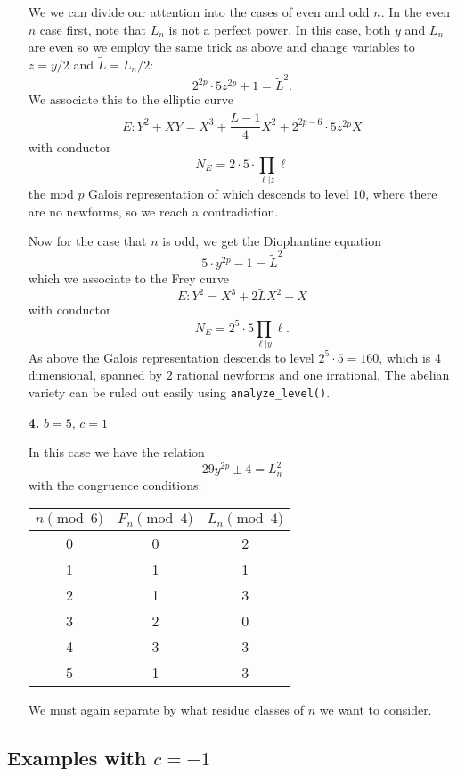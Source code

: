 \documentclass[12pt]{article}
\begin{document}
\begin{enumerate}
We we can divide our attention into the cases of even and odd $n$.  In the even $n$ case first, note that $L_n$ is not a perfect power.  In this case, both $y$ and $L_n$ are even so we employ the same trick as above and change variables to $z = y/2$ and $\tilde{L} =  L_n/2$:
\[ 2^{2p} \cdot 5 z^{2p} + 1 = \tilde{L}^2. \]
We associate this to the elliptic curve 
\[ E: Y^2 + XY = X^3 + \frac{\tilde{L} -1}{4} X^2 + 2^{2p-6} \cdot 5 z^{2p} X \]
with conductor
\[N_E = 2 \cdot 5 \cdot \prod_{\ell | z} \ell \]
the mod $p$ Galois representation of which descends to level $10$, where there are no newforms, so we reach a contradiction.

Now for the case that $n$ is odd, we get the Diophantine equation
\[ 5 \cdot y^{2p} -1 = \tilde{L}^2 \]
which we associate to the Frey curve
\[ E: Y^2 = X^3 + 2\tilde{L} X^2 - X \]
with conductor
\[N_E = 2^5\cdot 5 \prod_{\ell | y} \ell. \]
As above the Galois representation descends to level $2^5 \cdot 5 = 160$, which is 4 dimensional, spanned by $2$ rational newforms and one irrational.   The abelian variety can be ruled out easily using \texttt{analyze\_level()}.

\item[\textbf{4.}] $b = 5$, $c = 1$

In this case we have the relation 
\[ 29y^{2p} \pm 4 = L_n^2 \]
with the congruence conditions:
\begin{center}
\begin{tabular}{c| c c}
$n \pmod{6}$ & $F_n \pmod{4}$ & $L_n \pmod{4}$ \\ \hline \hline
0 & 0 & 2 \\
1 & 1 &  1 \\
2 & 1 & 3 \\
3 & 2 & 0 \\
4 & 3 & 3 \\
5 & 1 & 3  \\ \hline \hline
\end{tabular}
\end{center}

We must again separate by what residue classes of $n$ we want to consider.  

\end{enumerate}


\subsection{Examples with $c = -1$}
\end{document}
